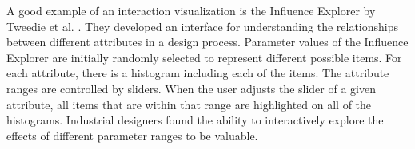 A good example of an interaction visualization is the Influence Explorer by Tweedie et al. \cite{tweedie1995}.  They developed an interface for understanding the relationships between different attributes in a design process.  Parameter values of the Influence Explorer are initially randomly selected to represent different possible items.  For each attribute, there is a histogram including each of the items.  The attribute ranges are controlled by sliders.  When the user adjusts the slider of a given attribute, all items that are within that range are highlighted on all of the histograms.  Industrial designers found the ability to interactively explore the effects of different parameter ranges to be valuable.
